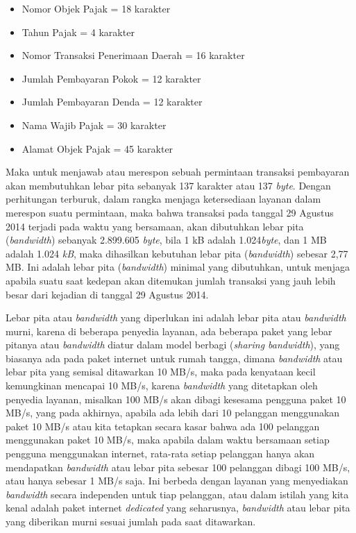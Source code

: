 \documentclass[pdftex,12pt, oneside]{article}
\begin{document}
\begin{enumerate}
\begin{itemize}
  \item Nomor Objek Pajak = 18 karakter
  \item Tahun Pajak = 4 karakter
  \item Nomor Transaksi Penerimaan Daerah = 16 karakter
  \item Jumlah Pembayaran Pokok = 12 karakter
  \item Jumlah Pembayaran Denda = 12 karakter
  \item Nama Wajib Pajak = 30 karakter
  \item Alamat Objek Pajak = 45 karakter
\end{itemize}

Maka untuk menjawab atau merespon sebuah permintaan transaksi pembayaran akan membutuhkan lebar pita sebanyak 137 karakter atau 137 \textit{byte}. Dengan perhitungan terburuk, dalam rangka menjaga ketersediaan layanan dalam merespon suatu permintaan, maka bahwa transaksi pada tanggal 29 Agustus 2014 terjadi pada waktu yang bersamaan, akan dibutuhkan lebar pita (\textit{bandwidth}) sebanyak 2.899.605 \textit{byte}, bila 1 kB adalah 1.024\textit{byte}, dan 1 MB adalah 1.024 \textit{kB}, maka dihasilkan kebutuhan lebar pita (\textit{bandwidth}) sebesar 2,77 MB. Ini adalah lebar pita (\textit{bandwidth}) minimal yang dibutuhkan, untuk menjaga apabila suatu saat kedepan akan ditemukan jumlah transaksi yang jauh lebih besar dari kejadian di tanggal 29 Agustus 2014.

Lebar pita atau \textit{bandwidth} yang diperlukan ini adalah lebar pita atau \textit{bandwidth} murni, karena di beberapa penyedia layanan, ada beberapa paket yang lebar pitanya atau \textit{bandwidth} diatur dalam model berbagi (\textit{sharing bandwidth}), yang biasanya ada pada paket internet untuk rumah tangga, dimana \textit{bandwidth} atau lebar pita yang semisal ditawarkan 10 MB/s, maka pada kenyataan kecil kemungkinan mencapai 10 MB/s, karena \textit{bandwidth} yang ditetapkan oleh penyedia layanan, misalkan 100 MB/s akan dibagi kesesama pengguna paket 10 MB/s, yang pada akhirnya, apabila ada lebih dari 10 pelanggan menggunakan paket 10 MB/s atau kita tetapkan secara kasar bahwa ada 100 pelanggan menggunakan paket 10 MB/s, maka apabila dalam waktu bersamaan setiap pengguna menggunakan internet, rata-rata setiap pelanggan hanya akan mendapatkan \textit{bandwidth} atau lebar pita sebesar 100 pelanggan dibagi 100 MB/s, atau hanya sebesar 1 MB/s saja. Ini berbeda dengan layanan yang menyediakan \textit{bandwidth} secara independen untuk tiap pelanggan, atau dalam istilah yang kita kenal adalah paket internet \textit{dedicated} yang seharusnya, \textit{bandwidth} atau lebar pita yang diberikan murni sesuai jumlah pada saat ditawarkan.


\end{enumerate}
\end{document}
